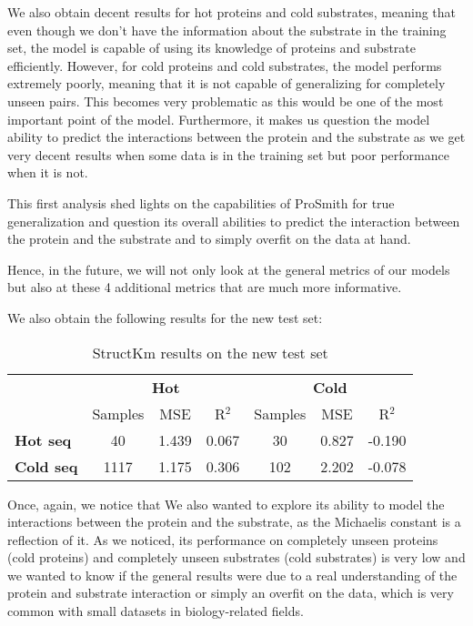 We also obtain decent results for hot proteins and cold substrates, meaning that even though we don't
have the information about the substrate in the training set, the model is capable of using its 
knowledge of proteins and substrate efficiently. However, for cold proteins and cold substrates, the model
performs extremely poorly, meaning that it is not capable of generalizing for completely unseen pairs.
This becomes very problematic as this would be one of the most important point of the model. Furthermore,
it makes us question the model ability to predict the interactions between the protein and the substrate
as we get very decent results when some data is in the training set but poor performance when it is not.

This first analysis shed lights on the capabilities of ProSmith for true generalization and question its
overall abilities to predict the interaction between the protein and the substrate and to simply overfit
on the data at hand.

Hence, in the future, we will not only look at the general metrics of our models but also at these 4
additional metrics that are much more informative.

We also obtain the following results for the new test set:

\begin{table}[ht]
  \centering
  \begin{tabular}{lcccccc}
  \hline
   & \multicolumn{3}{c}{\textbf{Hot}} & \multicolumn{3}{c}{\textbf{Cold}} \\
   & Samples & MSE & R\(^2\) & Samples & MSE & R\(^2\) \\ \hline
  \textbf{Hot seq}  & 40 & 1.439 & 0.067 & 30 & 0.827 & -0.190 \\
  \textbf{Cold seq} & 1117 & 1.175 & 0.306 & 102 & 2.202 & -0.078 \\ \hline
  \end{tabular}
  \caption{StructKm results on the new test set}
  \label{tab:summary_performance}
\end{table}

Once, again, we notice that \textcolor{add results + analysis of results}

We also wanted to 
explore its ability to model the interactions between the protein and the substrate, as the Michaelis constant
is a reflection of it. As we noticed, its performance on completely unseen proteins (cold proteins) and
completely unseen substrates (cold substrates) is very low and we wanted to know if the general results were
due to a real understanding of the protein and substrate interaction or simply an overfit on the data, which
is very common with small datasets in biology-related fields.

